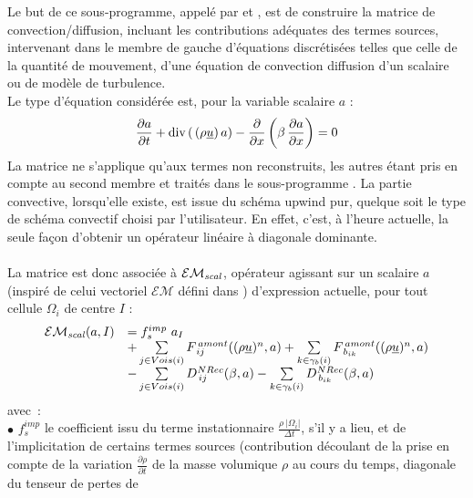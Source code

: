 Le but de ce sous-programme, appelé par  et , est de construire la
matrice de convection/diffusion, incluant les contributions adéquates des termes sources,
intervenant dans le membre de gauche d'équations discrétisées telles que
celle de la
quantité de mouvement, d'une équation de convection diffusion d'un scalaire
ou de modèle de turbulence.\\
Le type d'équation considérée est, pour la variable scalaire $a$ :
\begin{equation}\notag
\displaystyle \frac{\partial a}{\partial t} + \text{div}\, (\,(\rho \underline{u})\, a) -
\displaystyle \frac{\partial }{\partial x}\left(\beta\,\frac{\partial a}{\partial x}\right) = 0
\end{equation}
La matrice ne s'applique qu'aux termes non reconstruits, les autres étant pris en compte au second membre et
traités dans le sous-programme . La partie
convective, lorsqu'elle existe, est issue du schéma upwind pur, quelque soit
le type de schéma convectif choisi par l'utilisateur. En effet, c'est, à
l'heure actuelle, la seule façon d'obtenir un opérateur linéaire à
diagonale dominante.\\\\
La matrice est donc associée à $\mathcal{EM_{\it{scal}}}$, opérateur
agissant sur un scalaire $a$ (inspiré de celui vectoriel $\mathcal{EM}$
défini dans ) d'expression actuelle, pour tout cellule $\Omega_i$ de
centre $I$  :
\begin{equation}\notag
\begin{array}{lll}
\mathcal{EM_{\it{scal}}}(a,I) &=  f_s^{imp}\ a_I\ \\
&+\sum\limits_{j\in Vois(i)}{F^{\,amont}_{\,ij}((\rho\underline{u})^n,a)}
+\sum\limits_{k\in {\gamma_b(i)}} {F^{\,amont}_{\,{b}_{ik}}((\rho
\underline{u})^n,a)}\\
&-\sum\limits_{j\in Vois(i)}{D^{NRec}_{\,ij}(\beta,a)}
-\sum\limits_{k\in {\gamma_b(i)}} {D^{NRec}_{\,{b}_{ik}}(\beta,a)}\\
\end{array}
\end{equation}
avec~:\\
$\bullet$ $f_s^{imp}$ le coefficient issu du terme instationnaire
$\displaystyle\frac{\rho \ |\Omega_i|}{\Delta t}$, s'il y a lieu, et de
l'implicitation de certains termes sources (contribution découlant de la prise
en compte de la
variation $\displaystyle\frac{\partial \rho }{\partial t}$ de
la masse volumique $\rho$ au cours du temps, diagonale du tenseur de pertes de
